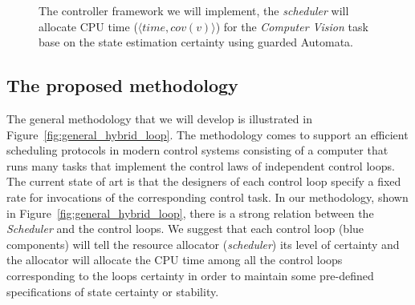 \documentclass[11pt]{article}
\begin{document}
\begin{figure}[h]
    \centering
    
    \caption{The controller framework we will implement, the \textit{scheduler} will allocate CPU time ($\langle time,cov(v) \rangle$) for the \textit{Computer Vision} task base on the state estimation certainty using guarded Automata.
    \label{fig:hybrid_loop}}
\end{figure}

\subsection{The proposed methodology}
\label{sec:our proposal}

The general methodology that we will develop is illustrated in Figure~\ref{fig:general_hybrid_loop}.
The methodology comes to support an efficient scheduling protocols in modern control systems consisting of a computer that runs many tasks that implement the control laws of independent control loops. 
The current state of art is that the designers of each control loop specify a fixed rate for invocations of the corresponding control task.
In our methodology, shown in Figure~\ref{fig:general_hybrid_loop}, there is a strong relation between the \textit{Scheduler} and the control loops. We suggest that each control loop (blue components) will tell the resource allocator (\textit{scheduler}) its level of certainty and the allocator will allocate the CPU time among all the control loops corresponding to the loops certainty in order to maintain some pre-defined specifications of state certainty or stability.
\end{document}
